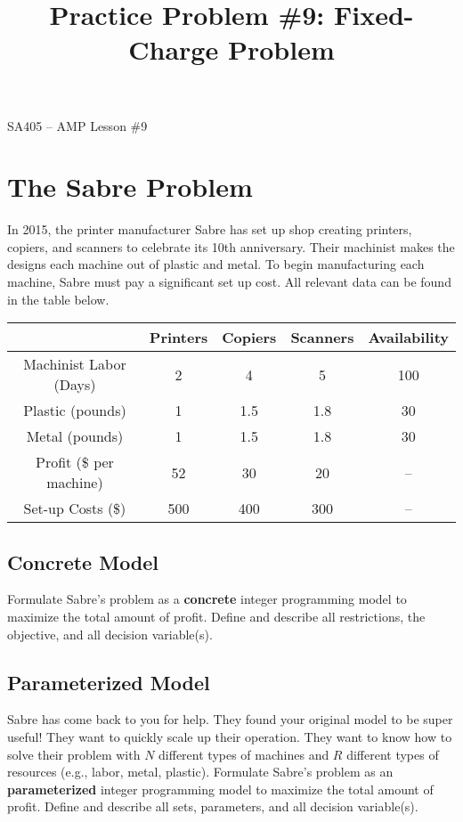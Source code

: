 \documentclass[11pt]{article}
\makeatletter
\theoremstyle{definition}
\renewcommand{\maketitle}{
  \noindent SA405 -- AMP \hfill Lesson \#9\\

  \begin{center}\Large{\textbf{\@title}}\end{center}
}
\makeatother
\begin{document}
  
\title{Practice Problem \#9: Fixed-Charge Problem}

\maketitle

\section{The Sabre Problem}
In 2015, the printer manufacturer Sabre has set up shop creating printers,
copiers, and scanners to celebrate its 10th anniversary. Their machinist makes the
designs each machine out of plastic and metal. To begin manufacturing each machine, Sabre must pay a significant set up cost. All relevant data can be found in the table below.

\begin{center}
\begin{tabular}{|c|c|c|c|c|} \hline
 & Printers & Copiers & Scanners & Availability\\ \hline
Machinist Labor (Days) & 2 & 4 & 5 & 100 \\ \hline
Plastic (pounds) & 1& 1.5 & 1.8 & 30 \\ \hline
Metal (pounds) & 1& 1.5 & 1.8 & 30 \\ \hline
Profit (\$ per machine) & 52 & 30 & 20 &-- \\ \hline
Set-up Costs (\$) & 500 & 400 & 300  & -- \\ \hline
\end{tabular}
\end{center}
\subsection{Concrete Model}
Formulate Sabre's problem as a \textbf{concrete} integer programming model to maximize the total amount of profit. Define and describe all restrictions, the objective, and all decision variable(s).
\pagebreak

\subsection{Parameterized Model}
Sabre has come back to you for help. They found your original model to be super useful! They want to quickly scale up their operation. They want to know how to solve their problem with $N$ different types of machines and $R$ different types of resources (e.g., labor, metal, plastic). Formulate Sabre's problem as an \textbf{parameterized} integer programming model to maximize the total amount of profit. Define and describe all sets, parameters, and all decision variable(s).
\newpage
\end{document}
